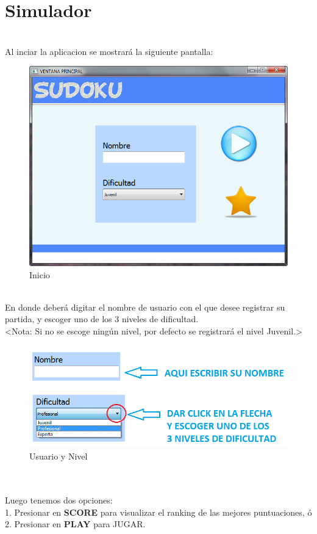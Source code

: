 \section{Simulador}
\ \\ Al inciar la aplicacion se mostrará la siguiente pantalla:

\begin{figure}[htbp]
\begin{center}
\includegraphics[width=.70\textwidth]{./imagenes/Inicio1.png}
\caption{Inicio}
\label{Inicio}
\end{center}
\end{figure}

\ \\ En donde deberá digitar el nombre de usuario con el que desee registrar su partida, y escoger uno de los 3 niveles de dificultad. \\ <Nota: Si no se escoge ningún nivel, por defecto se registrará el nivel Juvenil.>

\begin{figure}[htbp]
\begin{center}
\includegraphics[width=.60\textwidth]{./imagenes/Inicio4.png}
\caption{Usuario y Nivel}
\label{Usuario y Nivel}
\end{center}
\end{figure}

\ \\ \ \\ 
Luego tenemos dos opciones: \\ 1. Presionar en \textbf{SCORE} para visualizar el ranking de las mejores puntuaciones, ó \\ 2. Presionar en \textbf{PLAY} para JUGAR. 

